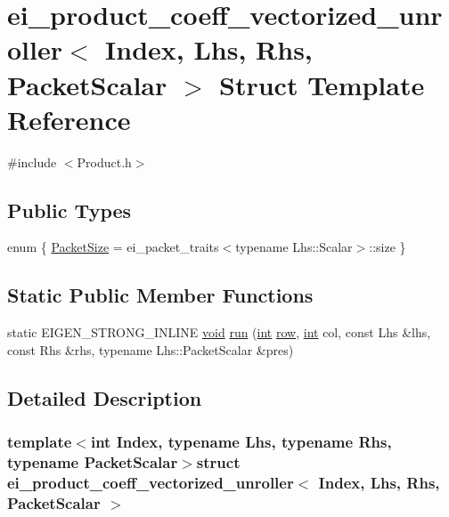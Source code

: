 \hypertarget{structei__product__coeff__vectorized__unroller}{\section{ei\-\_\-product\-\_\-coeff\-\_\-vectorized\-\_\-unroller$<$ Index, Lhs, Rhs, Packet\-Scalar $>$ Struct Template Reference}
\label{structei__product__coeff__vectorized__unroller}
}


{\ttfamily \#include $<$Product.\-h$>$}

\subsection*{Public Types}
\begin{DoxyCompactItemize}
\item 
enum \{ \hyperlink{structei__product__coeff__vectorized__unroller_ad08b7b48e05f11cfcc9f524238fe031ea55b6b191ea763f8a8d6551ff863e5dae}{Packet\-Size} = ei\-\_\-packet\-\_\-traits$<$typename Lhs\-:\-:Scalar$>$\-:\-:size
 \}
\end{DoxyCompactItemize}
\subsection*{Static Public Member Functions}
\begin{DoxyCompactItemize}
\item 
static E\-I\-G\-E\-N\-\_\-\-S\-T\-R\-O\-N\-G\-\_\-\-I\-N\-L\-I\-N\-E \hyperlink{group___u_a_v_objects_plugin_ga444cf2ff3f0ecbe028adce838d373f5c}{void} \hyperlink{structei__product__coeff__vectorized__unroller_a1093e18d32b8ee6cd04d0c2924a0a24e}{run} (\hyperlink{ioapi_8h_a787fa3cf048117ba7123753c1e74fcd6}{int} \hyperlink{glext_8h_a11b277b422822f784ee248b43eee3e1e}{row}, \hyperlink{ioapi_8h_a787fa3cf048117ba7123753c1e74fcd6}{int} col, const Lhs \&lhs, const Rhs \&rhs, typename Lhs\-::\-Packet\-Scalar \&pres)
\end{DoxyCompactItemize}


\subsection{Detailed Description}
\subsubsection*{template$<$int Index, typename Lhs, typename Rhs, typename Packet\-Scalar$>$struct ei\-\_\-product\-\_\-coeff\-\_\-vectorized\-\_\-unroller$<$ Index, Lhs, Rhs, Packet\-Scalar $>$}



